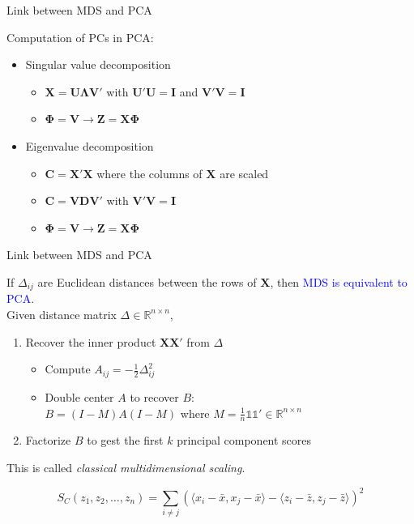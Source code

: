 \documentclass[14pt]{beamer}
\begin{document}
\begin{frame}{Link between MDS and PCA}

Computation of PCs in PCA:
\begin{itemize}

\item Singular value decomposition

\begin{itemize}
\item $\bm{X} = \bm{U}\bm{\Lambda}\bm{V}'$ with $\bm{U}'\bm{U}=\bm{I}$ and $\bm{V}'\bm{V}=\bm{I}$
\item $\bm{\Phi} = \bm{V} \rightarrow \bm{Z} = \bm{X}\bm{\Phi}$
\end{itemize}
	
\item Eigenvalue decomposition

\begin{itemize}
\item $\bm{C} = \bm{X'X}$ where the columns of $\bm{X}$ are scaled
\item $\bm{C}=\bm{V}\bm{D}\bm{V}'$ with $\bm{V}'\bm{V}=\bm{I}$
\item $\bm{\Phi} = \bm{V} \rightarrow \bm{Z} = \bm{X}\bm{\Phi}$
\end{itemize}

\end{itemize}


\end{frame}

\begin{frame}{Link between MDS and PCA} \small 

If $\Delta_{ij}$ are Euclidean distances between the rows of $\bm{X}$, then \textcolor{blue}{MDS is equivalent to PCA}.\\[.2cm]

Given distance matrix $\Delta \in \mathbb{R}^{n \times n}$,
\begin{enumerate}
	\item Recover the inner product $\bm{XX'}$ from $\Delta$
		\begin{itemize}
		\item Compute $A_{ij} = - \frac12 \Delta_{ij}^2$
		\item Double center $A$ to recover $B$: \\
		
			$B = (I - M) A (I - M)$ where $M = \frac1n \mathds{1}\mathds{1}' \in \mathbb{R}^{n \times n}$
		
		\end{itemize}
	\item Factorize $B$ to gest the first $k$ principal component scores
\end{enumerate}
This is called \emph{classical multidimensional scaling}.

$$ S_C(z_1, z_2, \dots, z_n) = \sum_{i \neq j} (\langle x_i - \bar x, x_j - \bar x\rangle - \langle z_i -\bar z, z_j -\bar z\rangle)^2$$

\end{frame}
\end{document}
